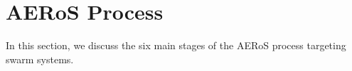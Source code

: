 \documentclass[runningheads]{llncs}
\begin{document}
\section{AERoS Process}\label{framework}
In this section, we discuss the six main stages of the AERoS process targeting swarm systems. 
%
%

%
%

\end{document}
